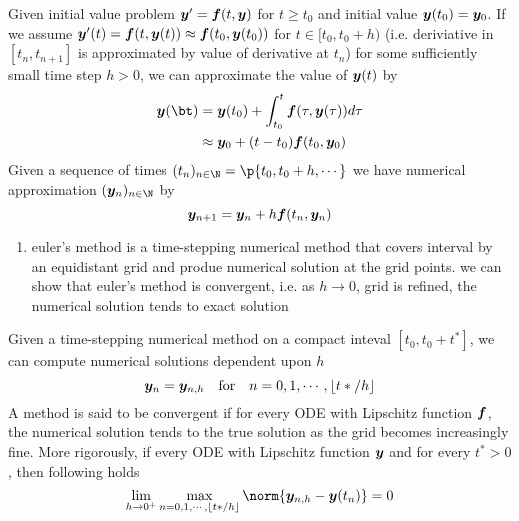 \documentclass[11pt]{article}
\begin{document}
\begin{definition*}
     Given initial value problem $\by' = \bf(t, \by)$ for $t\geq t_0$ and initial value $\by(t_0) = \by_0$. If we assume $\by'(t) = \bf(t, \by(t)) \approx \bf(t_0, \by(t_0))$ for $t\in [t_0,t_0+h)$ (i.e. deriviative in $[t_n, t_{n+1}]$ is approximated by value of derivative at $t_n$) for some sufficiently small time step $h>0$, we can approximate the value of $\by(t)$ by
    \begin{align*}
        \by(\bt) 
        &= \by(t_0) + \int_{t_0}^t \bf(\tau, \by(\tau)) d\tau  \\
        &\approx \by_0 + (t-t_0) \bf(t_0, \by_0)
    \end{align*}
    Given a sequence of times $(t_n)_{n\in\N} = \p{t_0, t_0+h,\cdots}$ we have numerical approximation $(\by_n)_{n\in\N}$ by 
    \[
        \by_{n+1} = \by_n + h\bf(t_n, \by_n)
    \]
    \begin{enumerate}
        \item {} euler's method is a time-stepping numerical method that covers interval by an equidistant grid and produe numerical solution at the grid points. we can show that euler's method is convergent, i.e. as $h\to 0$, grid is refined, the numerical solution tends to exact solution
    \end{enumerate}
\end{definition*}

\begin{definition*}
     Given a time-stepping numerical method on a compact inteval $[t_0, t_0+t^*]$, we can compute numerical solutions dependent upon $h$
    \[
        \by_n = \by_{n,h}
        \quad \text{for}
        \quad n = 0,1,\cdots,\lfloor t*/h\rfloor    
    \]
    A method is said to be convergent if for every ODE with Lipschitz function $\bf$, the numerical solution tends to the true solution as the grid becomes increasingly fine. More rigorously, if every ODE with Lipschitz function $\by$ and for every $t^*>0$, then following holds 
    \[
        \lim_{h\to 0^+} \max_{n=0,1,\cdots,\lfloor t*/h\rfloor    } \norm{\by_{n,h} - \by(t_n)} = 0
    \]
\end{definition*}
\end{document}

